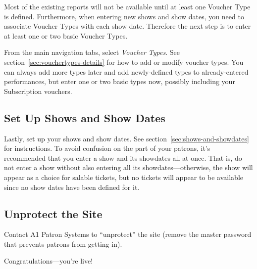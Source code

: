 Most of the existing reports will not be available until at least one
Voucher Type is defined.  Furthermore, when entering new shows and show
dates, you need to associate Voucher Types with each show date.
Therefore the next step is to enter at least
one or two basic Voucher Types.

From the main navigation tabs, select \emph{Voucher Types}.  See
section~\ref{sec:vouchertypes-details} for how to add or modify voucher
types.  You can always add more types later and add newly-defined types
to already-entered performances, but enter one or two basic types now,
possibly including your Subscription vouchers.

\subsection{Set Up Shows and Show Dates}
\label{sec:setup-shows-and-showdates}

Lastly, set up your shows and show dates.  See
section~\ref{sec:shows-and-showdates} for instructions.  To avoid
confusion on the part of your patrons, it's recommended that you enter a
show and its showdates all at once.  That is, do not enter a show
without also entering all its showdates---otherwise, the show will
appear as a choice for salable tickets, but no tickets will appear to be
available since no show dates have been defined for it.

\subsection{Unprotect the Site}

Contact A1 Patron Systems to ``unprotect'' the site (remove the master
password that prevents patrons from getting in).

Congratulations---you're live!

